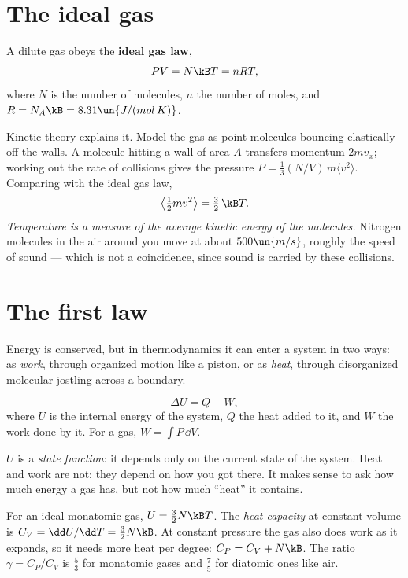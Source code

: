 \section{The ideal gas}

A dilute gas obeys the \textbf{ideal gas law},
\[
  PV = N\kB T = nRT,
\]
where $N$ is the number of molecules, $n$ the number of moles, and $R = N_A\kB = 8.31\un{J/(mol\,K)}$.

Kinetic theory explains it. Model the gas as point molecules bouncing elastically off the walls. A molecule hitting a wall of area $A$ transfers momentum $2mv_x$; working out the rate of collisions gives the pressure $P = \tfrac13 (N/V)\,m\langle v^2\rangle$. Comparing with the ideal gas law,
\[
  \big\langle\tfrac12 mv^2\big\rangle = \tfrac32\,\kB T .
\]
\emph{Temperature is a measure of the average kinetic energy of the molecules.} Nitrogen molecules in the air around you move at about $500\un{m/s}$, roughly the speed of sound --- which is not a coincidence, since sound is carried by these collisions.

\section{The first law}

Energy is conserved, but in thermodynamics it can enter a system in two ways: as \emph{work}, through organized motion like a piston, or as \emph{heat}, through disorganized molecular jostling across a boundary.

\begin{law}
\[
  \Delta U = Q - W,
\]
where $U$ is the internal energy of the system, $Q$ the heat added to it, and $W$ the work done by it. For a gas, $W = \int P\,\dd V$.
\end{law}

$U$ is a \emph{state function}: it depends only on the current state of the system. Heat and work are not; they depend on how you got there. It makes sense to ask how much energy a gas has, but not how much ``heat'' it contains.

For an ideal monatomic gas, $U = \tfrac32 N\kB T$. The \emph{heat capacity} at constant volume is $C_V = \dd U/\dd T = \tfrac32N\kB$. At constant pressure the gas also does work as it expands, so it needs more heat per degree: $C_P = C_V + N\kB$. The ratio $\gamma = C_P/C_V$ is $\tfrac53$ for monatomic gases and $\tfrac75$ for diatomic ones like air.

